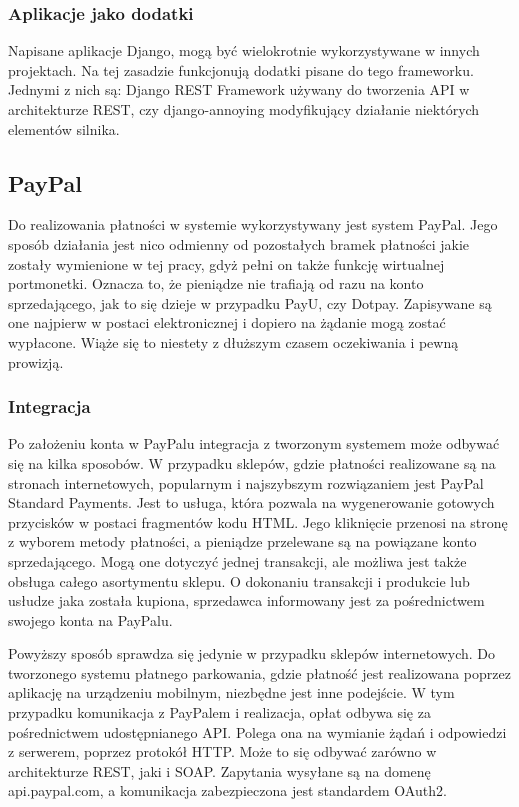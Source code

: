 \subsubsection*{Aplikacje jako dodatki}
Napisane aplikacje Django, mogą być wielokrotnie wykorzystywane w innych projektach. Na tej zasadzie funkcjonują dodatki pisane do tego frameworku. Jednymi z nich są: Django REST Framework używany do tworzenia API w architekturze REST, czy django-annoying modyfikujący działanie niektórych elementów silnika.

\subsection{PayPal}

Do realizowania płatności w systemie wykorzystywany jest system PayPal. Jego sposób działania jest nico odmienny od 
pozostałych bramek płatności jakie zostały wymienione w tej pracy, gdyż pełni on także 
funkcję wirtualnej portmonetki. Oznacza to, że pieniądze nie trafiają od razu 
na konto sprzedającego, jak to się dzieje w przypadku PayU, czy Dotpay. 
Zapisywane są one najpierw w postaci elektronicznej i dopiero na żądanie mogą 
zostać wypłacone. Wiąże się to niestety z dłuższym czasem oczekiwania i pewną 
prowizją. 

\subsubsection*{Integracja}

Po założeniu konta w PayPalu integracja z tworzonym systemem może odbywać się 
na kilka sposobów. W przypadku sklepów, gdzie płatności realizowane są na 
stronach internetowych, popularnym i najszybszym rozwiązaniem jest PayPal 
Standard Payments. Jest to usługa, która pozwala na wygenerowanie gotowych 
przycisków w postaci fragmentów kodu HTML. Jego kliknięcie przenosi na stronę 
z wyborem metody płatności, a pieniądze przelewane są na powiązane konto 
sprzedającego. Mogą one dotyczyć jednej transakcji, ale możliwa jest także 
obsługa całego asortymentu sklepu. O dokonaniu transakcji i produkcie lub 
usłudze jaka została kupiona, sprzedawca informowany jest za pośrednictwem 
swojego konta na PayPalu.

Powyższy sposób sprawdza się jedynie w przypadku sklepów internetowych. Do 
tworzonego systemu płatnego parkowania, gdzie płatność jest realizowana poprzez 
aplikację na urządzeniu mobilnym, niezbędne jest inne podejście. W tym 
przypadku komunikacja z PayPalem i realizacja, opłat odbywa się za pośrednictwem 
udostępnianego API. Polega ona na wymianie żądań i odpowiedzi z serwerem, 
poprzez protokół HTTP. Może to się odbywać zarówno w architekturze REST, jaki i 
SOAP. Zapytania wysyłane są na domenę api.paypal.com, a komunikacja 
zabezpieczona jest standardem OAuth2.


